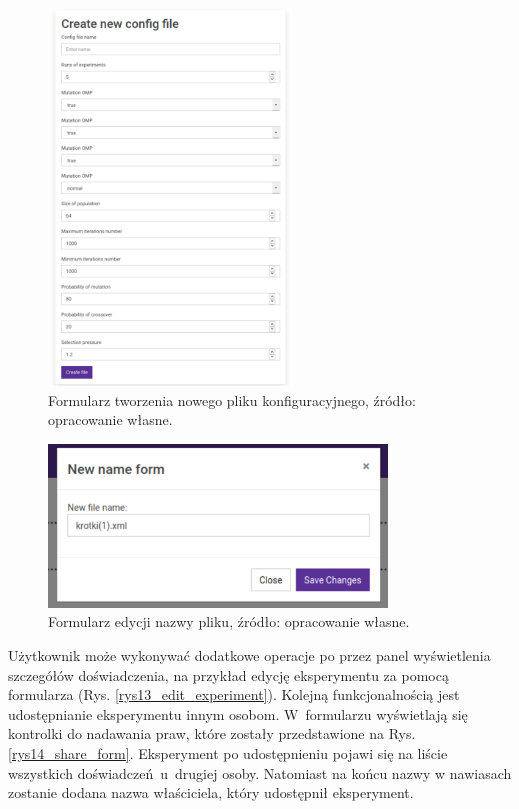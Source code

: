 \begin{figure}[htb]
	\centering
	\includegraphics[height=10cm]{grafika/config_form.eps}
	\caption{Formularz tworzenia nowego pliku konfiguracyjnego, źródło: opracowanie własne.}
	\label{rys18_config_form}
\end{figure}

\begin{figure}[htb]
	\centering
	\includegraphics[width=9cm]{grafika/edit_name.eps}
	\caption{Formularz edycji nazwy pliku, źródło: opracowanie własne.}
	\label{rys19_edit_name}
\end{figure}

Użytkownik może wykonywać dodatkowe operacje po przez panel wyświetlenia szczegółów doświadczenia, na przykład edycję eksperymentu za pomocą formularza (Rys. \ref{rys13_edit_experiment}). Kolejną funkcjonalnością jest udostępnianie eksperymentu innym osobom. W~formularzu wyświetlają się kontrolki do nadawania praw, które zostały przedstawione na Rys. \ref{rys14_share_form}. Eksperyment po udostępnieniu pojawi się na liście wszystkich doświadczeń u~drugiej osoby. Natomiast na końcu nazwy w nawiasach zostanie dodana nazwa właściciela, który udostępnił eksperyment. 



